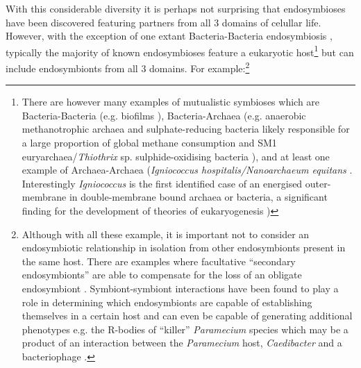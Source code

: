 With this considerable diversity it is perhaps not surprising that endosymbioses have been discovered featuring partners from all 3 domains of celullar life. %
However, with the exception of one extant Bacteria-Bacteria endosymbiosis \citep{vonDohlen2001}, typically the majority of known
endosymbioses feature a eukaryotic host\footnote{There are however many examples of mutualistic symbioses which are Bacteria-Bacteria (e.g. biofilms \citep{Watnick2000}),
    Bacteria-Archaea (e.g. anaerobic methanotrophic archaea and sulphate-reducing bacteria likely responsible
    for a large proportion of global methane consumption \citep{Boetius2000,Knittel2009} and SM1 
    euryarchaea/\textit{Thiothrix} sp. sulphide-oxidising bacteria \citep{Henneberger2006,Wrede2012}), 
    and at least one example of Archaea-Archaea (\textit{Igniococcus hospitalis/Nanoarchaeum equitans} \citep{Huber2002}. 
    Interestingly \textit{Igniococcus} is the first identified case of an energised outer-membrane in 
    double-membrane bound archaea or bacteria, a significant finding for the development of theories of
eukaryogenesis \citep{Kuper2010})} but can include endosymbionts from all 3 domains.
For example:\footnote{Although with all these example, it is important not 
    to consider an endosymbiotic relationship 
    in isolation from other endosymbionts present in the same host.
    There are examples where facultative ``secondary endosymbionts'' 
    are able to compensate for the loss of an obligate endosymbiont \citep{Koga2003}.  Symbiont-symbiont 
    interactions have been found to play a role in determining which endosymbionts are capable of establishing themselves 
    in a certain host and can even be capable of generating additional phenotypes e.g. the R-bodies of ``killer'' \textit{Paramecium} 
    species which may be a product of an interaction between the \textit{Paramecium} host, \textit{Caedibacter} and a bacteriophage
    \citep{Schrallhammer2009}. %
}
